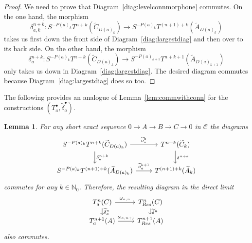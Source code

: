 \documentclass[12pt,a4paper]{article}
\numberwithin{equation}{section}
\newtheorem{lem}[thm]{Lemma}
\theoremstyle{nonumberplain}
\newtheorem{proof}{Proof}
\begin{document}
\begin{proof}
We need to prove that Diagram~\ref{diag:levelconnmorphone} commutes. On the one hand, the morphism
\[ \delta_{a, k}^{n+k}: S^{-P(a)_k}T^{n+k}(\widetilde{C}_{D(a)_k}) \rightarrow S^{-P(a)_k}T^{(n+1)+k}(\widetilde{A}_{D(a)_k}) \]
takes us first down the front side of Diagram~\ref{diag:largestdiag} and then over to its back side. On the other hand, the morphism
\[ \delta_a^{n+k}: S^{-P(a)_k}T^{n+k}(\widetilde{C}_{D(a)_k}) \rightarrow S^{-P(a)_{k+1}}T^{n+k+1}(\widetilde{A}_{D(a)_{k+1}}) \]
only takes us down in Diagram~\ref{diag:largestdiag}. The desired diagram commutes because Diagram~\ref{diag:largestdiag} does so too.
\end{proof}

The following provides an analogue of Lemma~\ref{lem:commwithconn} for the constructions $(T_a^{\bullet}, \widetilde{\delta}_a^{\bullet})$.

\begin{lem}\label{lem:commwithconna}
For any short exact sequence $0 \rightarrow A \rightarrow B \rightarrow C \rightarrow 0$ in $\mathcal{C}$ the diagrams
\begin{equation}\label{diag:levelconnmorphtwo}
\begin{tikzcd}
    S^{-P(a)_k}T^{n+k}(\widetilde{C}_{D(a)_k}) \arrow[r, "\widehat{o}_a^k"] \arrow[d, "\delta_a^{n+k}"] & T^{n+k}(\widetilde{C}_k) \arrow[d, "\delta^{n+k}"] \\
    S^{-P(a)_k}T^{(n+1)+k}(\widetilde{A}_{D(a)_k}) \arrow[r, "\widehat{o}_a^{k+1}"] & T^{(n+1)+k}(\widetilde{A}_k)
\end{tikzcd}
\end{equation}
commutes for any $k \in \mathbb{N}_0$. Therefore, the resulting diagram in the direct limit 
\begin{equation}\label{diag:limitconnmorph}
\begin{tikzcd}[row sep = small]
  T_a^n(C) \arrow[r, "\omega_{a, n}"] \arrow[d, "\widetilde{\delta}_a^n"]
  & T_{Res}^n(C) \arrow[d, "\widetilde{\delta}^n"] \\
  T_a^{n+1}(A) \arrow[r, "\omega_{a, n+1}"]
  & T_{Res}^{n+1}(A)
\end{tikzcd}
\end{equation}
also commutes.
\end{lem}
\end{document}
